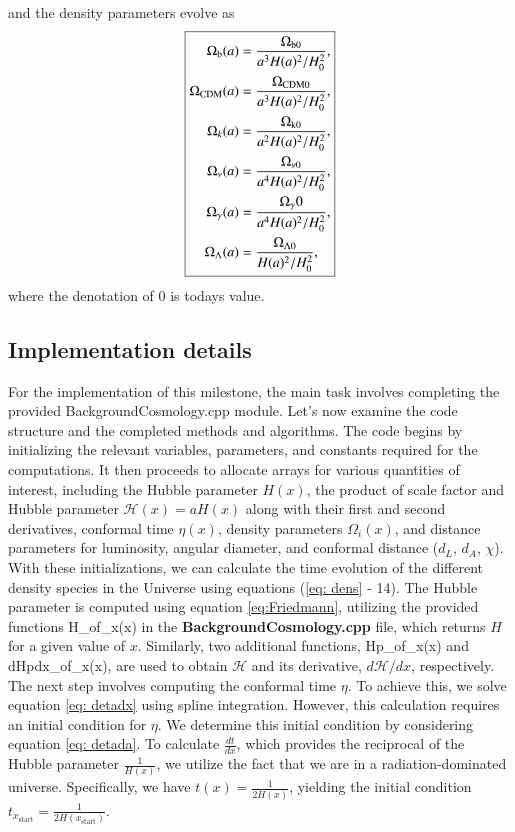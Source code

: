 \documentclass{aa}
\begin{document}
and the density parameters evolve as 
\begin{equation}
      \boxed{
   \begin{aligned}
      \Omega_{\rm b}(a) &= \frac{\Omega_{\rm b0}}{a^3H(a)^2/H_0^2}, \\
      \Omega_{\rm CDM}(a) &= \frac{\Omega_{\rm CDM0}}{a^3H(a)^2/H_0^2},\\
      \Omega_{k}(a) &= \frac{\Omega_{\rm k0}}{a^2H(a)^2/H_0^2}, \\
      \Omega_{\nu}(a) &= \frac{\Omega_{\nu0}}{a^4H(a)^2/H_0^2}, \\
      \Omega_{\gamma}(a) &= \frac{\Omega_\gamma0}{a^4H(a)^2/H_0^2},\\
      \Omega_{\Lambda}(a) &= \frac{\Omega_{\Lambda0}}{H(a)^2/H_0^2},
   \end{aligned}}
\end{equation}
where the denotation of 0 is todays value.


\subsection{Implementation details}
For the implementation of this milestone, the main task involves completing the provided BackgroundCosmology.cpp module. Let's now examine the code structure and the completed methods and algorithms. The code begins by initializing the relevant variables, parameters, and constants required for the computations. It then proceeds to allocate arrays for various quantities of interest, including the Hubble parameter $H(x)$, the product of scale factor and Hubble parameter $\mathcal{H}(x) = aH(x)$ along with their first and second derivatives, conformal time $\eta(x)$, density parameters $\Omega_i(x)$, and distance parameters for luminosity, angular diameter, and conformal distance ($d_L$, $d_A$, $\chi$). With these initializations, we can calculate the time evolution of the different density species in the Universe using equations (\ref{eq: dens} - 14). The Hubble parameter is computed using equation \eqref{eq:Friedmann}, utilizing the provided functions H\_of\_x(x) in the \textbf{BackgroundCosmology.cpp} file, which returns $H$ for a given value of $x$. Similarly, two additional functions, Hp\_of\_x(x) and dHpdx\_of\_x(x), are used to obtain $\mathcal{H}$ and its derivative, $d\mathcal{H}/dx$, respectively. The next step involves computing the conformal time $\eta$. To achieve this, we solve equation \eqref{eq: detadx} using spline integration. However, this calculation requires an initial condition for $\eta$. We determine this initial condition by considering equation \eqref{eq: detada}. To calculate $\frac{dt}{dx}$, which provides the reciprocal of the Hubble parameter $\frac{1}{H(x)}$, we utilize the fact that we are in a radiation-dominated universe. Specifically, we have $t(x)=\frac{1}{2H(x)}$, yielding the initial condition $t_{x_\text{start}} = \frac{1}{2H(x_\text{start})}$.
\end{document}
